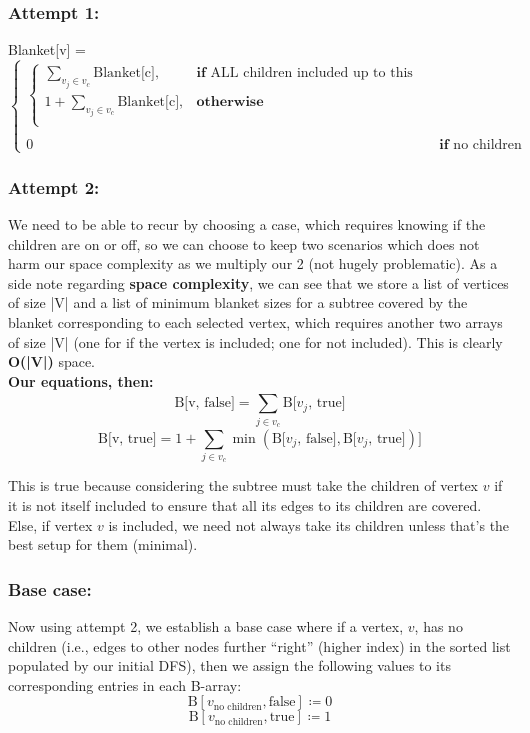 \documentclass[conference]{styles/acmsiggraph}
\newcommand{\?}{\stackrel{?}{=}}
\begin{document}
\subsubsection{Attempt 1:}
Blanket[v] = 
$\begin{cases}
    \begin{cases}
        \sum^{}_{v_j \in v_c} \text{Blanket[c]}, & \textbf{if } \text{ALL children included up to this point}\\
        1 + \sum^{}_{v_j \in v_c} \text{Blanket[c]}, & \textbf{otherwise}\\
    \end{cases}\\ \\
    0 & \textbf{if } \text{no children}
\end{cases}$

\subsubsection{Attempt 2:}
We need to be able to recur by choosing a case, which requires knowing if the children are on or off, so we can choose to keep two scenarios which does not harm our space complexity as we multiply our 2 (not hugely problematic).  As a side note regarding \textbf{space complexity}, we can see that we store a list of vertices of size |V| and a list of minimum blanket sizes for a subtree covered by the blanket corresponding to each selected vertex, which requires another two arrays of size |V| (one for if the vertex is included; one for not included).  This is clearly \textbf{O(|V|)} space. \\

\textbf{Our equations, then:} \\
$$\text{B[v, false]} = \sum^{}_{j \in v_c}\text{B[$v_j$, true]}$$
$$\text{B[v, true]} = 1 + \sum^{}_{j \in v_c}\min(\text{B[$v_j$, false]}, \text{B[$v_j$, true]})]$$

This is true because considering the subtree must take the children of vertex $v$ if it is not itself included to ensure that all its edges to its children are covered.  Else, if vertex $v$ is included, we need not always take its children unless that's the best setup for them (minimal).

\subsubsection{Base case:}
Now using attempt 2, we establish a base case where if a vertex, $v$, has no children (i.e., edges to other nodes further \enquote{right} (higher index) in the sorted list populated by our initial DFS), then we assign the following values to its corresponding entries in each B-array: \\
$$\text{B}[v_{\text{no children}}, \text{false}] \coloneq 0$$
$$\text{B}[v_{\text{no children}}, \text{true}] \coloneq 1$$
\end{document}
